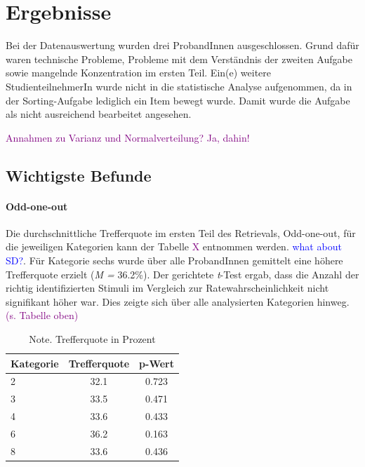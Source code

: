 \section{Ergebnisse}
\label{S:3}
Bei der Datenauswertung wurden drei ProbandInnen ausgeschlossen. Grund dafür waren technische Probleme, Probleme mit dem Verständnis der zweiten Aufgabe sowie mangelnde Konzentration im ersten Teil.
Ein(e) weitere StudienteilnehmerIn wurde nicht in die statistische Analyse aufgenommen, da in der Sorting-Aufgabe lediglich ein Item bewegt wurde. Damit wurde die Aufgabe als nicht ausreichend bearbeitet angesehen.

\textcolor{purple}{Annahmen zu Varianz und Normalverteilung? Ja, dahin!}

\subsection{Wichtigste Befunde}
\paragraph{Odd-one-out}
Die durchschnittliche Trefferquote im ersten Teil des Retrievals, Odd-one-out, für die jeweiligen Kategorien kann der Tabelle \textcolor{purple}{X} entnommen werden. \textcolor{blue}{what about SD?}. Für Kategorie sechs wurde über alle ProbandInnen gemittelt eine höhere Trefferquote erzielt (\textit{M =} 36.2\%).
Der gerichtete \textit{t}-Test ergab, dass die Anzahl der richtig identifizierten Stimuli im Vergleich zur Ratewahrscheinlichkeit nicht signifikant höher war. Dies zeigte sich über alle analysierten Kategorien hinweg. \textcolor{purple}{(s. Tabelle oben)}

\begin{table}[h]
\centering
\begin{tabular}{l c c} %
\hline
\textbf{Kategorie} & \textbf{Trefferquote} & \textbf{p-Wert}\\
\hline
2 & 32.1 & 0.723\\
3 & 33.5 & 0.471\\
4 & 33.6 & 0.433\\
6 & 36.2 & 0.163\\
8 & 33.6 & 0.436\\
\hline
\end{tabular}
\caption{Note. Trefferquote in Prozent}
\end{table}

